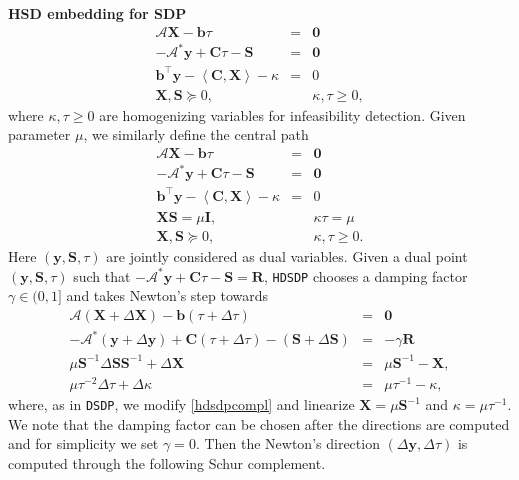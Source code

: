 {\textbf{HSD embedding for SDP}}
\begin{eqnarray}
  \mathcal{A} \mathbf{X} - \mathbf{b} \tau & = & \textbf{0} \nonumber\\
  - \mathcal{A}^{\ast} \mathbf{y} + \mathbf{C} \tau - \mathbf{S} & = & \textbf{0}  \\
  \mathbf{b}^{\top} \mathbf{y} - \left\langle \mathbf{C}, \mathbf{X} \right\rangle - \kappa & = & 0 \nonumber\\
  \mathbf{X}, \mathbf{S} \succeq 0, &  & \kappa, \tau \geq 0 \nonumber,
\end{eqnarray}
where $\kappa, \tau \geq 0$ are homogenizing variables for infeasibility
detection. Given parameter $\mu$, we similarly define the central path
\begin{eqnarray}
  \mathcal{A} \mathbf{X} - \mathbf{b} \tau & = & \textbf{0} \nonumber \\
  - \mathcal{A}^{\ast} \mathbf{y} + \mathbf{C} \tau - \mathbf{S} & = & \textbf{0} \nonumber \\
  \mathbf{b}^{\top} \mathbf{y} - \left\langle \mathbf{C}, \mathbf{X} \right\rangle - \kappa & = & 0 \nonumber \\
  \mathbf{X} \mathbf{S} = \mu \mathbf{I}, &  & \kappa \tau = \mu \label{hdsdpcompl} \\
  \mathbf{X}, \mathbf{S} \succeq 0, &  & \kappa, \tau \geq 0. \nonumber
\end{eqnarray}
Here $\left( \mathbf{y}, \mathbf{S}, \tau \right)$ are jointly considered as dual variables.
Given a dual point $\left( \mathbf{y}, \mathbf{S}, \tau \right)$ such that $- \mathcal{A}^{\ast} \mathbf{y} +
\mathbf{C} \tau - \mathbf{S} = \mathbf{R}$, {{\texttt{HDSDP}}} chooses a damping factor $\gamma \in
(0, 1]$ and takes Newton's step towards
\begin{eqnarray*}
  \mathcal{A} \left( \mathbf{X} + \Delta \mathbf{X} \right) - \mathbf{b} (\tau + \Delta \tau) & = & \textbf{0}\\
  -\mathcal{A}^{\ast} \left( \mathbf{y} + \Delta \mathbf{y} \right) + \mathbf{C} (\tau + \Delta \tau)
  - \left( \mathbf{S} + \Delta \mathbf{S} \right) & = & - \gamma \mathbf{R}\\
  \mu \mathbf{S}^{- 1} \Delta \mathbf{S} \mathbf{S}^{- 1} + \Delta \mathbf{X} & = & \mu \mathbf{S}^{- 1} - \mathbf{X},\\
  \mu \tau^{- 2} \Delta \tau + \Delta \kappa & = & \mu \tau^{- 1} - \kappa,
\end{eqnarray*}
where, as in {{\texttt{DSDP}}}, we modify \eqref{hdsdpcompl} and linearize $\mathbf{X} = \mu \mathbf{S}^{- 1}$ and $\kappa
= \mu \tau^{- 1}$. We note that the damping factor can be chosen after the
directions are computed and for simplicity we set $\gamma = 0$. Then the
Newton's direction $\left( \Delta \mathbf{y}, \Delta \tau \right)$ is computed through
the following Schur complement.


